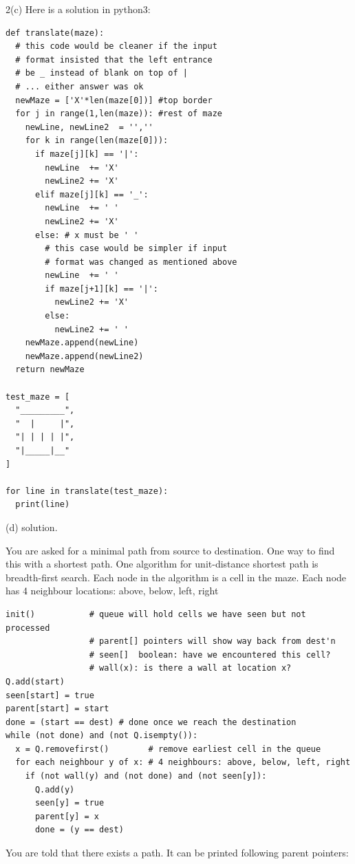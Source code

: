 \documentclass[12pt]{article}
\begin{document}
2(c) Here is a solution in python3:

{\small
\begin{verbatim}
def translate(maze):
  # this code would be cleaner if the input
  # format insisted that the left entrance
  # be _ instead of blank on top of |
  # ... either answer was ok
  newMaze = ['X'*len(maze[0])] #top border
  for j in range(1,len(maze)): #rest of maze
    newLine, newLine2  = '',''
    for k in range(len(maze[0])):
      if maze[j][k] == '|':
        newLine  += 'X'
        newLine2 += 'X'
      elif maze[j][k] == '_':
        newLine  += ' '
        newLine2 += 'X'
      else: # x must be ' '
        # this case would be simpler if input
        # format was changed as mentioned above
        newLine  += ' '
        if maze[j+1][k] == '|':
          newLine2 += 'X'
        else:
          newLine2 += ' '
    newMaze.append(newLine)
    newMaze.append(newLine2)
  return newMaze

test_maze = [
  "_________",
  "  |     |",
  "| | | | |",
  "|_____|__"
]

for line in translate(test_maze): 
  print(line)
\end{verbatim}}

(d) solution.

You are asked for a minimal path from source to destination.
One way to find this with a shortest path.
One algorithm for unit-distance shortest path is breadth-first search.
Each node in the algorithm is a cell in the maze.
Each node has 4 neighbour locations: above, below, left, right

\begin{verbatim}
init()           # queue will hold cells we have seen but not processed
                 # parent[] pointers will show way back from dest'n
                 # seen[]  boolean: have we encountered this cell?
                 # wall(x): is there a wall at location x?
Q.add(start)
seen[start] = true
parent[start] = start  
done = (start == dest) # done once we reach the destination
while (not done) and (not Q.isempty()):
  x = Q.removefirst()        # remove earliest cell in the queue
  for each neighbour y of x: # 4 neighbours: above, below, left, right
    if (not wall(y) and (not done) and (not seen[y]): 
      Q.add(y)
      seen[y] = true
      parent[y] = x
      done = (y == dest)
\end{verbatim}

You are told that there exists a path.
It can be printed following parent pointers:
\end{document}
